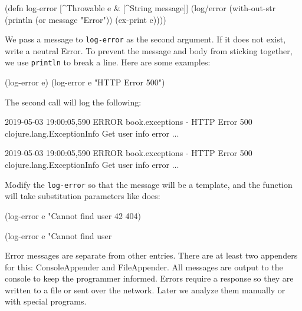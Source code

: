 \begin{clojure}
(defn log-error
  [^Throwable e & [^String message]]
  (log/error
   (with-out-str
     (println (or message "Error"))
     (ex-print e))))
\end{clojure}

We pass a message to \verb|log-error| as the second argument. If it does not exist, write a neutral Error. To prevent the message and body from sticking together, we use \verb|println| to break a line. Here are some examples:

\begin{clojure}
(log-error e)
(log-error e "HTTP Error 500")
\end{clojure}

The second call will log the following:

\ifnarrow

\begin{text}
2019-05-03 19:00:05,590 ERROR
book.exceptions - HTTP Error 500
clojure.lang.ExceptionInfo
  Get user info error
  ...
\end{text}

\else

\begin{text}
2019-05-03 19:00:05,590 ERROR book.exceptions - HTTP Error 500
clojure.lang.ExceptionInfo
  Get user info error
  ...
\end{text}

\fi

Modify the \verb|log-error| so that the message will be a template, and the function will take substitution parameters like  does:

\ifnarrow

\begin{clojure}
(log-error e
  "Cannot find user %
  42 404)
\end{clojure}

\else

\begin{clojure}
(log-error e "Cannot find user %
\end{clojure}

\fi

Error messages are separate from other entries. There are at least two appenders for this: ConsoleAppender and FileAppender. All messages are output to the console to keep the programmer informed. Errors require a response so they are written to a file or sent over the network. Later we analyze them manually or with special programs.

